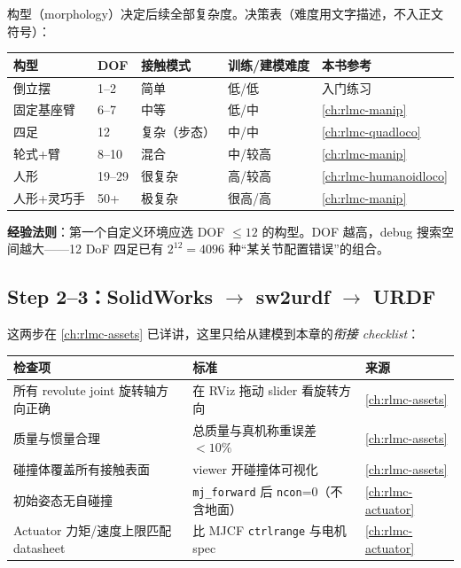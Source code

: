 构型（morphology）决定后续全部复杂度。决策表（难度用文字描述，不入正文符号）：

\begin{center}
\small
\begin{tabular}{@{}lllll@{}}
\toprule
构型 & DOF & 接触模式 & 训练/建模难度 & 本书参考 \\
\midrule
倒立摆 & 1--2 & 简单 & 低/低 & 入门练习 \\
固定基座臂 & 6--7 & 中等 & 低/中 & \cref{ch:rlmc-manip} \\
四足 & 12 & 复杂（步态） & 中/中 & \cref{ch:rlmc-quadloco} \\
轮式+臂 & 8--10 & 混合 & 中/较高 & \cref{ch:rlmc-manip} \\
人形 & 19--29 & 很复杂 & 高/较高 & \cref{ch:rlmc-humanoidloco} \\
人形+灵巧手 & 50+ & 极复杂 & 很高/高 & \cref{ch:rlmc-manip} \\
\bottomrule
\end{tabular}
\end{center}

\textbf{经验法则}：第一个自定义环境应选 DOF $\le 12$ 的构型。DOF 越高，debug 搜索空间越大——12 DoF 四足已有 $2^{12}=4096$ 种“某关节配置错误”的组合。

\subsection{\texorpdfstring{Step 2--3：SolidWorks $\to$ sw2urdf $\to$ URDF}{Step 2-3：SolidWorks 到 sw2urdf 到 URDF}}
\label{sec:rlmc-diy-pipe-urdf}

这两步在 \cref{ch:rlmc-assets} 已详讲，这里只给从建模到本章的\emph{衔接 checklist}：

\begin{center}
\small
\begin{tabular}{@{}p{6.0cm}p{5.0cm}l@{}}
\toprule
检查项 & 标准 & 来源 \\
\midrule
所有 revolute joint 旋转轴方向正确 & 在 RViz 拖动 slider 看旋转方向 & \cref{ch:rlmc-assets} \\
质量与惯量合理 & 总质量与真机称重误差 $<10\%$ & \cref{ch:rlmc-assets} \\
碰撞体覆盖所有接触表面 & viewer 开碰撞体可视化 & \cref{ch:rlmc-assets} \\
初始姿态无自碰撞 & \verb|mj_forward| 后 \verb|ncon|=0（不含地面） & \cref{ch:rlmc-actuator} \\
Actuator 力矩/速度上限匹配 datasheet & 比 MJCF \verb|ctrlrange| 与电机 spec & \cref{ch:rlmc-actuator} \\
\bottomrule
\end{tabular}
\end{center}

